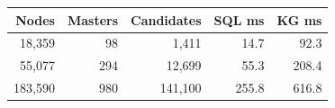 \begin{tabular}{rrrrr}
\toprule
Nodes & Masters & Candidates & SQL ms & KG ms \\
\midrule
18,359 & 98 & 1,411 & 14.7 & 92.3 \\
55,077 & 294 & 12,699 & 55.3 & 208.4 \\
183,590 & 980 & 141,100 & 255.8 & 616.8 \\
\bottomrule
\end{tabular}
